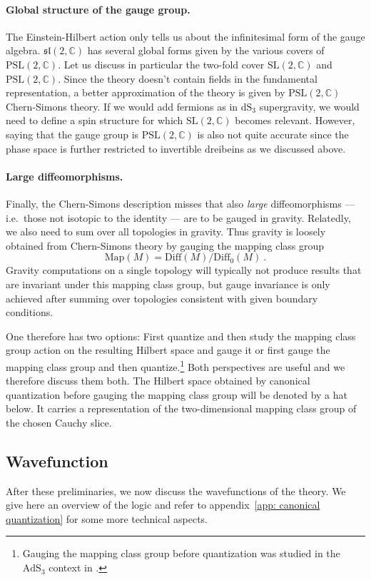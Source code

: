\documentclass[12pt,a4paper]{article}
\newcommand{\be}{\begin{equation}}
\newcommand{\ee}{\end{equation}}
\newcommand\PSL{\text{PSL}}
\newcommand\SL{\text{SL}}
\newcommand\Diff{\text{Diff}}
\newcommand\CC{\mathbb{C}}
\begin{document}
\paragraph{Global structure of the gauge group.} The Einstein-Hilbert action only tells us about the infinitesimal form of the gauge algebra. $\mathfrak{sl}(2,\CC)$ has several global forms given by the various covers of $\PSL(2,\CC)$. Let us discuss in particular the two-fold cover $\SL(2,\CC)$ and $\PSL(2,\CC)$. Since the theory doesn't contain fields in the fundamental representation, a better approximation of the theory is given by $\PSL(2,\CC)$ Chern-Simons theory. If we would add fermions as in $\mathrm{dS}_3$ supergravity, we would need to define a spin structure for which $\SL(2,\CC)$ becomes relevant. However, saying that the gauge group is $\PSL(2,\CC)$ is also not quite accurate since the phase space is further restricted to invertible dreibeins as we discussed above. 

\paragraph{Large diffeomorphisms.} Finally, the Chern-Simons description misses that also \emph{large} diffeomorphisms --- i.e.\ those not isotopic to the identity --- are to be gauged in gravity. Relatedly, we also need to sum over all topologies in gravity. Thus gravity is loosely obtained from Chern-Simons theory by gauging the mapping class group
\be 
\text{Map}(M)=\Diff(M)/\Diff_0(M)~.
\ee
Gravity computations on a single topology will typically not produce results that are invariant under this mapping class group, but gauge invariance is only achieved after summing over topologies consistent with given boundary conditions.

One therefore has two options: First quantize and then study the mapping class group action on the resulting Hilbert space and gauge it or first gauge the mapping class group and then quantize.\footnote{Gauging the mapping class group before quantization was studied in the $\mathrm{AdS}_3$ context in \cite{Maloney:2015ina, Eberhardt:2022wlc}.}
Both perspectives are useful and we therefore discuss them both. The Hilbert space obtained by canonical quantization before gauging the mapping class group will be denoted by a hat below. It carries a representation of the two-dimensional mapping class group of the chosen Cauchy slice.

\subsection{Wavefunction} \label{subsec:wavefunction}
After these preliminaries, we now discuss the wavefunctions of the theory. We give here an overview of the logic and refer to appendix~\ref{app: canonical quantization} for some more technical aspects.
\end{document}
